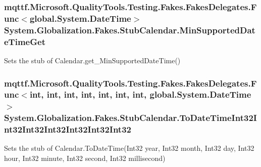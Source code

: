 \hypertarget{class_system_1_1_globalization_1_1_fakes_1_1_stub_calendar_a967748574f842e2576fbdf50de11dc65}{
\subsubsection[{Min\-Supported\-Date\-Time\-Get}]{\setlength{\rightskip}{0pt plus 5cm}mqttf.\-Microsoft.\-Quality\-Tools.\-Testing.\-Fakes.\-Fakes\-Delegates.\-Func$<$global.\-System.\-Date\-Time$>$ System.\-Globalization.\-Fakes.\-Stub\-Calendar.\-Min\-Supported\-Date\-Time\-Get}}\label{class_system_1_1_globalization_1_1_fakes_1_1_stub_calendar_a967748574f842e2576fbdf50de11dc65}


Sets the stub of Calendar.\-get\-\_\-\-Min\-Supported\-Date\-Time()

\hypertarget{class_system_1_1_globalization_1_1_fakes_1_1_stub_calendar_a1d39a795e9bf297bd8c6605bf0d40966}{
\subsubsection[{To\-Date\-Time\-Int32\-Int32\-Int32\-Int32\-Int32\-Int32\-Int32}]{\setlength{\rightskip}{0pt plus 5cm}mqttf.\-Microsoft.\-Quality\-Tools.\-Testing.\-Fakes.\-Fakes\-Delegates.\-Func$<$int, int, int, int, int, int, int, global.\-System.\-Date\-Time$>$ System.\-Globalization.\-Fakes.\-Stub\-Calendar.\-To\-Date\-Time\-Int32\-Int32\-Int32\-Int32\-Int32\-Int32\-Int32}}\label{class_system_1_1_globalization_1_1_fakes_1_1_stub_calendar_a1d39a795e9bf297bd8c6605bf0d40966}


Sets the stub of Calendar.\-To\-Date\-Time(\-Int32 year, Int32 month, Int32 day, Int32 hour, Int32 minute, Int32 second, Int32 millisecond)


